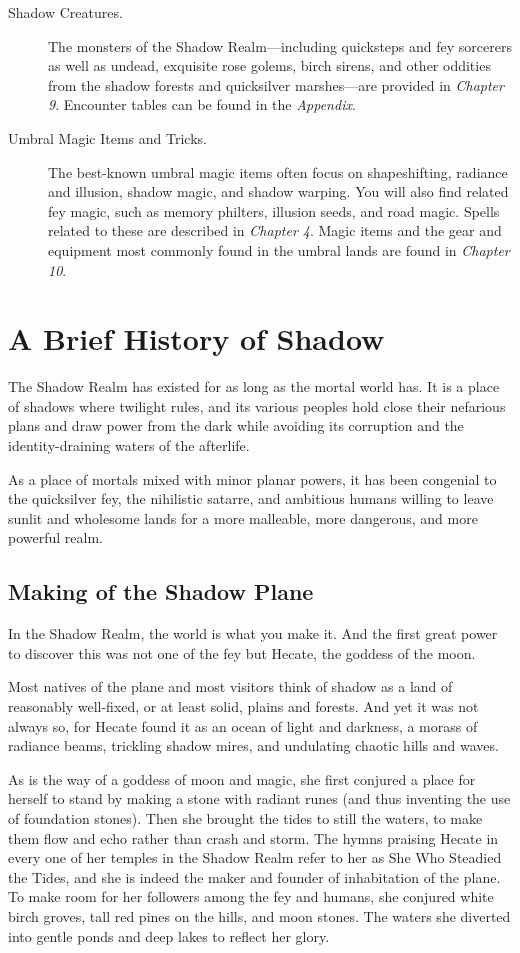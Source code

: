\documentclass[10pt,a4paper,twoside,bg=print,twocolumn,openany,nodeprecatedcode]{dndbook}
\begin{document}
\begin{description}
\item[Shadow Creatures.]
The monsters of the Shadow Realm—including quicksteps and fey sorcerers as well as undead, exquisite rose golems, birch sirens, and other oddities from the shadow forests and quicksilver marshes—are provided in \textit{Chapter 9}. Encounter tables can be found in the \textit{Appendix}.
\item[Umbral Magic Items and Tricks.]
The best-known umbral magic items often focus on shapeshifting, radiance and illusion, shadow magic, and shadow warping. You will also find related fey magic, such as memory philters, illusion seeds, and road magic. Spells related to these are described in \textit{Chapter 4}. Magic items and the gear and equipment most commonly found in the umbral lands are found in \textit{Chapter 10}.
\end{description}

\section{A Brief History of Shadow}
The Shadow Realm has existed for as long as the mortal world has. It is a place of shadows where twilight rules, and its various peoples hold close their nefarious plans and draw power from the dark while avoiding its corruption and the identity-draining waters of the afterlife.

As a place of mortals mixed with minor planar powers, it has been congenial to the quicksilver fey, the nihilistic satarre, and ambitious humans willing to leave sunlit and wholesome lands for a more malleable, more dangerous, and more powerful realm.

\subsection{Making of the Shadow Plane}
In the Shadow Realm, the world is what you make it. And the first great power to discover this was not one of the fey but Hecate, the goddess of the moon.

Most natives of the plane and most visitors think of shadow as a land of reasonably well-fixed, or at least solid, plains and forests. And yet it was not always so, for Hecate found it as an ocean of light and darkness, a morass of radiance beams, trickling shadow mires, and undulating chaotic hills and waves.

As is the way of a goddess of moon and magic, she first conjured a place for herself to stand by making a stone with radiant runes (and thus inventing the use of foundation stones). Then she brought the tides to still the waters, to make them flow and echo rather than crash and storm. The hymns praising Hecate in every one of her temples in the Shadow Realm refer to her as She Who Steadied the Tides, and she is indeed the maker and founder of inhabitation of the plane. To make room for her followers among the fey and humans, she conjured white birch groves, tall red pines on the hills, and moon stones. The waters she diverted into gentle ponds and deep lakes to reflect her glory.
\end{document}
